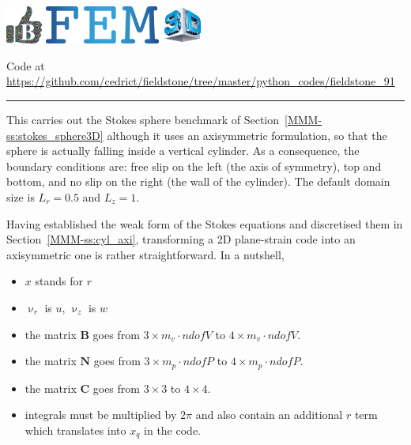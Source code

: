 \includegraphics[height=1.25cm]{images/pictograms/benchmark}
\includegraphics[height=1.25cm]{images/pictograms/FEM}
\includegraphics[height=1.25cm]{images/pictograms/3d}




\begin{center}
Code at \url{https://github.com/cedrict/fieldstone/tree/master/python_codes/fieldstone_91}
\end{center}

\par\noindent\rule{\textwidth}{0.4pt}



This \stone carries out the Stokes sphere benchmark of 
Section~\ref{MMM-ss:stokes_sphere3D} although 
it uses an axisymmetric formulation, so that the sphere is actually falling inside 
a vertical cylinder. As a consequence, the boundary conditions are: 
free slip on the left (the axis of symmetry), top and bottom, and no slip on the right (the
wall of the cylinder). The default domain size is $L_r=0.5$ and $L_z=1$.

Having established the weak form of the Stokes equations and discretised them in 
Section~\ref{MMM-ss:cyl_axi}, transforming a 2D plane-strain code into an axisymmetric 
one is rather straightforward. In a nutshell, 
\begin{itemize}
\item $x$ stands for $r$
\item $\upnu_r$ is $u$, $\upnu_z$ is $w$
\item the matrix ${\bm B}$ goes from 
$3 \times m_v\cdot ndofV$ to $4 \times m_v\cdot ndofV$. 
\item the matrix ${\bm N}$ goes from $3 \times m_p\cdot ndofP$ to $4 \times m_p\cdot ndofP$. 
\item the matrix ${\bm C}$ goes from $3 \times 3$ to $4 \times 4$.
\item integrals must be multiplied by $2 \pi$ and also contain an additional $r$ term
which translates into $x_q$ in the code. 
\end{itemize}

